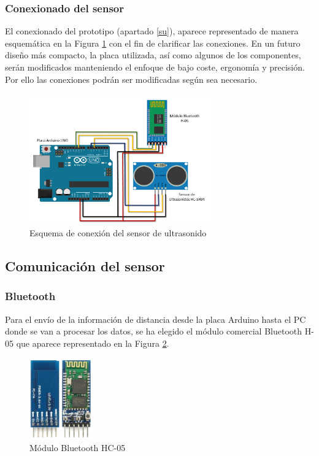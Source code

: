 	\subsubsection{Conexionado del sensor}
		El conexionado del prototipo (apartado \ref{su}), aparece representado de manera esquemática en la Figura \ref{fig:conexionado} con el fin de clarificar las conexiones. En un futuro diseño más compacto, la placa utilizada, así como algunos de los componentes, serán modificados manteniendo el enfoque de bajo coste, ergonomía y precisión. Por ello las conexiones podrán ser modificadas según sea necesario.
		
		 
		\begin{figure}[H]
			\centering
			\includegraphics[width=0.7\textwidth]{./graphics/conexionado}
			\caption{Esquema de conexión del sensor de ultrasonido} \label{fig:conexionado}
		\end{figure}
		
	\subsection{Comunicación del sensor}
	
		\subsubsection{Bluetooth}
		
		Para el envío de la información de distancia desde la placa Arduino hasta el PC donde se van a procesar los datos, se ha elegido el módulo comercial Bluetooth H-05 que aparece representado en la Figura \ref{fig:bluetooth}.
		
	
			 \begin{figure}[H]
			 	\centering
			 	\includegraphics[width=0.25\textwidth]{./graphics/bluetooth}
			 	\caption{Módulo Bluetooth HC-05} \label{fig:bluetooth}
			 \end{figure}
			 
